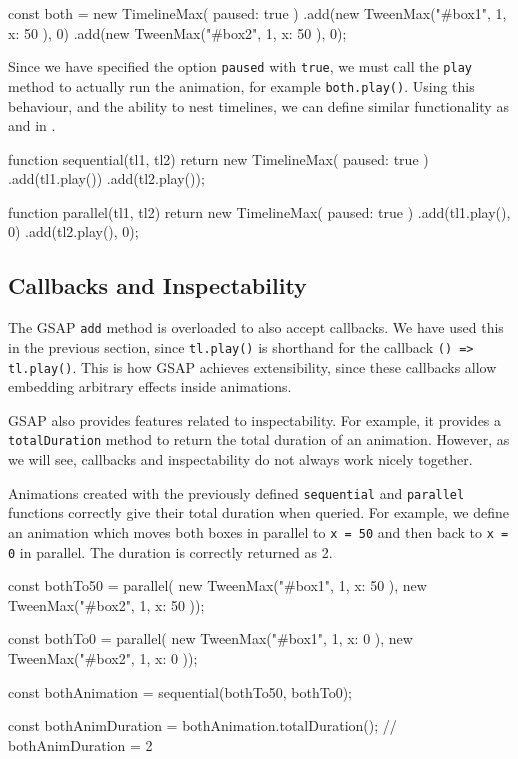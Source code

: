 \begin{js}
const both = new TimelineMax({ paused: true })
  .add(new TweenMax("#box1", 1, { x: 50 }), 0)
  .add(new TweenMax("#box2", 1, { x: 50 }), 0);
\end{js}

Since we have specified the option \texttt{paused} with \texttt{true}, we must
call the \texttt{play} method to actually run the animation, for example
\texttt{both.play()}. Using this behaviour, and the ability to nest timelines,
we can define similar functionality as  and  in
\dsl{}.

\begin{js}
function sequential(tl1, tl2) {
  return new TimelineMax({ paused: true })
    .add(tl1.play())
    .add(tl2.play()); }

function parallel(tl1, tl2) {
  return new TimelineMax({ paused: true })
    .add(tl1.play(), 0)
    .add(tl2.play(), 0); }
\end{js}

\subsection{Callbacks and Inspectability}

The GSAP \texttt{add} method is overloaded to also accept callbacks. We have
used this in the previous section, since \texttt{tl.play()} is shorthand for
the callback \texttt{() => tl.play()}. This is how GSAP achieves extensibility,
since these callbacks allow embedding arbitrary effects inside animations.

GSAP also provides features related to inspectability. For example, it provides a
\texttt{totalDuration} method to return the total duration of an animation.
However, as we will see, callbacks and inspectability do not always work nicely together.

Animations created with the previously defined \texttt{sequential} and
\texttt{parallel} functions correctly give their total duration when queried.
For example, we define an animation which moves both boxes in parallel to
\texttt{x = 50} and then back to \texttt{x = 0} in parallel. The duration is
correctly returned as 2.

\begin{js}
const bothTo50 = parallel(
  new TweenMax("#box1", 1, { x: 50 }),
  new TweenMax("#box2", 1, { x: 50 }));

const bothTo0 = parallel(
  new TweenMax("#box1", 1, { x: 0 }),
  new TweenMax("#box2", 1, { x: 0 }));

const bothAnimation = sequential(bothTo50, bothTo0);

const bothAnimDuration = bothAnimation.totalDuration();
// bothAnimDuration = 2
\end{js}


